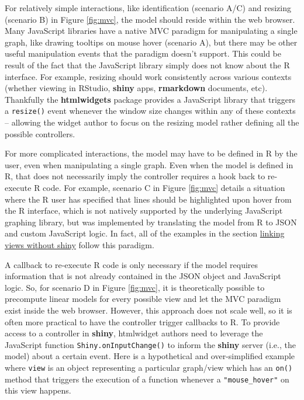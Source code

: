 \documentclass[12pt,]{isuthesis}
\begin{document}
For relatively simple interactions, like identification (scenario A/C)
and resizing (scenario B) in Figure \ref{fig:mvc}, the model should
reside within the web browser. Many JavaScript libraries have a native
MVC paradigm for manipulating a single graph, like drawing tooltips on
mouse hover (scenario A), but there may be other useful manipulation
events that the paradigm doesn't support. This could be result of the
fact that the JavaScript library simply does not know about the R
interface. For example, resizing should work consistently across various
contexts (whether viewing in RStudio, \textbf{shiny} apps,
\textbf{rmarkdown} documents, etc). Thankfully the \textbf{htmlwidgets}
package provides a JavaScript library that triggers a \texttt{resize()}
event whenever the window size changes within any of these contexts --
allowing the widget author to focus on the resizing model rather
defining all the possible controllers.

For more complicated interactions, the model may have to be defined in R
by the user, even when manipulating a single graph. Even when the model
is defined in R, that does not necessarily imply the controller requires
a hook back to re-execute R code. For example, scenario C in Figure
\ref{fig:mvc} details a situation where the R user has specified that
lines should be highlighted upon hover from the R interface, which is
not natively supported by the underlying JavaScript graphing library,
but was implemented by translating the model from R to JSON and custom
JavaScript logic. In fact, all of the examples in the section
\protect\hyperlink{linking-views-without-shiny}{linking views without
shiny} follow this paradigm.

A callback to re-execute R code is only necessary if the model requires
information that is not already contained in the JSON object and
JavaScript logic. So, for scenario D in Figure \ref{fig:mvc}, it is
theoretically possible to precompute linear models for every possible
view and let the MVC paradigm exist inside the web browser. However,
this approach does not scale well, so it is often more practical to have
the controller trigger callbacks to R. To provide access to a controller
in \textbf{shiny}, htmlwidget authors need to leverage the JavaScript
function \texttt{Shiny.onInputChange()} to inform the \textbf{shiny}
server (i.e., the model) about a certain event. Here is a hypothetical
and over-simplified example where \texttt{view} is an object
representing a particular graph/view which has an \texttt{on()} method
that triggers the execution of a function whenever a
\texttt{"mouse\_hover"} on this view happens.
\end{document}
